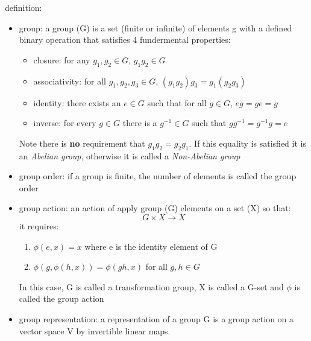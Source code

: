 definition:
\begin{itemize}
    \item group: a group (G) is a set (finite or infinite) of elements g with 
	a defined binary operation that satisfies 4 fundermental properties: 
	\begin{itemize}
	    \item closure: for any $g_1, g_2 \in G$, $g_1g_2 \in G$
	    \item associativity: for all $g_1, g_2, g_3 \in G$, $(g_1g_2)g_3 = g_1(g_2g_3)$
	    \item identity: there exists an $e \in G$ such that for all $g \in G$, $eg = ge = g$
	    \item inverse: for every $g \in G$ there is a $g^{-1} \in G$ such 
		that $gg^{-1} = g^{-1}g = e$
	\end{itemize}
	Note there is \textbf{no} requirement that $g_1g_2 = g_2g_1$.
	If this equality is satisfied it is an \textit{Abelian group}, otherwise
	it is called a \textit{Non-Abelian group}
    \item group order: if a group is finite, the number of elements is called 
	the group order
    \item group action: an action of apply group (G) elements on a set (X) so that:
	$$G \times X \rightarrow X$$
	it requires:
	\begin{enumerate}
	    \item $\phi(e, x) = x$ where e is the identity element of G 
	    \item $\phi(g, \phi(h, x)) = \phi(gh, x)$ for all $g, h \in G$
	\end{enumerate}
	In this case, G is called a transformation group, X is called a G-set
	and $\phi$ is called the group action
    \item group representation: a representation of a group G is a group action 
	on a vector space V by invertible linear maps.


\end{itemize}
